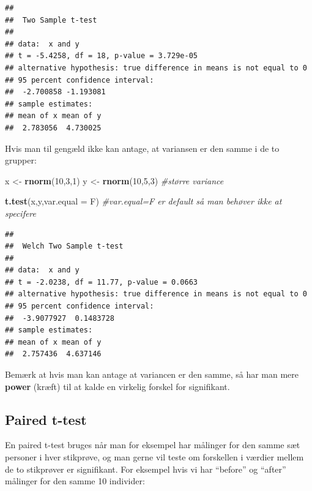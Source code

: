 \documentclass[
]{book}
\newenvironment{Shaded}{\begin{snugshade}}{\end{snugshade}}
\newcommand{\AttributeTok}[1]{\textcolor[rgb]{0.13,0.29,0.53}{#1}}
\newcommand{\CommentTok}[1]{\textcolor[rgb]{0.56,0.35,0.01}{\textit{#1}}}
\newcommand{\DecValTok}[1]{\textcolor[rgb]{0.00,0.00,0.81}{#1}}
\newcommand{\FunctionTok}[1]{\textcolor[rgb]{0.13,0.29,0.53}{\textbf{#1}}}
\newcommand{\NormalTok}[1]{#1}
\newcommand{\OtherTok}[1]{\textcolor[rgb]{0.56,0.35,0.01}{#1}}
\begin{document}
\begin{verbatim}
## 
##  Two Sample t-test
## 
## data:  x and y
## t = -5.4258, df = 18, p-value = 3.729e-05
## alternative hypothesis: true difference in means is not equal to 0
## 95 percent confidence interval:
##  -2.700858 -1.193081
## sample estimates:
## mean of x mean of y 
##  2.783056  4.730025
\end{verbatim}

Hvis man til gengæld ikke kan antage, at variansen er den samme i de to grupper:

\begin{Shaded}
\begin{Highlighting}[]
\NormalTok{x }\OtherTok{\textless{}{-}} \FunctionTok{rnorm}\NormalTok{(}\DecValTok{10}\NormalTok{,}\DecValTok{3}\NormalTok{,}\DecValTok{1}\NormalTok{)}
\NormalTok{y }\OtherTok{\textless{}{-}} \FunctionTok{rnorm}\NormalTok{(}\DecValTok{10}\NormalTok{,}\DecValTok{5}\NormalTok{,}\DecValTok{3}\NormalTok{) }\CommentTok{\#større variance}

\FunctionTok{t.test}\NormalTok{(x,y,}\AttributeTok{var.equal =}\NormalTok{ F) }\CommentTok{\#var.equal=F er \textquotesingle{}default\textquotesingle{} så man behøver ikke at specifere}
\end{Highlighting}
\end{Shaded}

\begin{verbatim}
## 
##  Welch Two Sample t-test
## 
## data:  x and y
## t = -2.0238, df = 11.77, p-value = 0.0663
## alternative hypothesis: true difference in means is not equal to 0
## 95 percent confidence interval:
##  -3.9077927  0.1483728
## sample estimates:
## mean of x mean of y 
##  2.757436  4.637146
\end{verbatim}

Bemærk at hvis man kan antage at variancen er den samme, så har man mere \textbf{power} (kræft) til at kalde en virkelig forskel for signifikant.

\subsection{Paired t-test}\label{paired-t-test}

En paired t-test bruges når man for eksempel har målinger for den samme sæt personer i hver stikprøve, og man gerne vil teste om forskellen i værdier mellem de to stikprøver er signifikant. For eksempel hvis vi har ``before'' og ``after'' målinger for den samme 10 individer:
\end{document}
